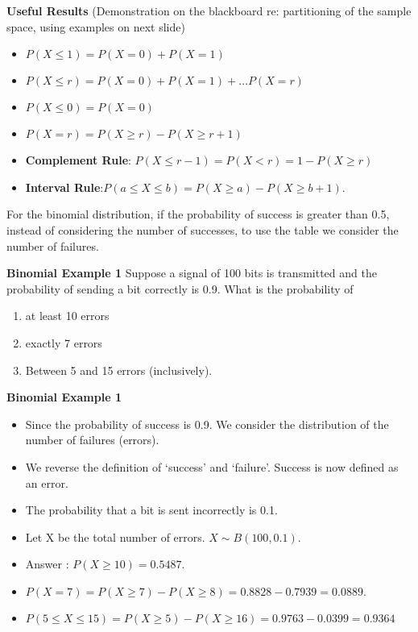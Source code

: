 \documentclass[a4]{beamer}
\begin{document}
\textbf{Useful Results}
(Demonstration on the blackboard re: partitioning of the sample space, using examples on next slide)
\begin{itemize}
\item $P(X \leq 1) = P(X=0) + P(X=1)$
\item $P(X \leq r) = P(X=0)+ P(X=1) + \ldots P(X= r)$
\item $P(X \leq 0) = P(X=0)$
\item $P(X = r) = P(X \geq r ) - P(X \geq r + 1)$
\item \textbf{Complement Rule}: $P(X \leq r-1) = P(X < r) = 1 - P(X \geq r)$
\item \textbf{Interval Rule}:$ P(a \leq X \leq  b)= P(X \geq a) - P(X \geq b + 1).$
\end{itemize}
For the binomial distribution, if the probability of success is greater than 0.5, instead of
considering the number of successes, to use the table we consider
the number of failures.




\textbf{Binomial Example 1}
Suppose a signal of 100 bits is transmitted and the probability of
sending a bit correctly is 0.9. What is the probability of
\begin{enumerate}
\item at least 10 errors
\item exactly 7 errors
\item Between 5 and 15 errors (inclusively).
\end{enumerate}


\textbf{Binomial Example 1}
\begin{itemize}
\item Since the probability of success is 0.9. We consider the distribution
of the number of failures (errors).
\item We reverse the definition of `success' and `failure'. Success is now defined as an error.
\item The probability that a bit is sent incorrectly is 0.1.
\item Let X be the total number of errors. $X \sim B(100, 0.1)$.
\item Answer : $P(X \geq 10) = 0.5487$.
\item $P(X = 7)=P(X \geq 7) - P(X \geq 8) =0.8828 - 0.7939 = 0.0889$.
\item $P(5 \leq X  \leq 15) = P(X \geq 5) - P(X \geq 16) =0.9763 - 0.0399 = 0.9364$
\end{itemize}


\end{document}
